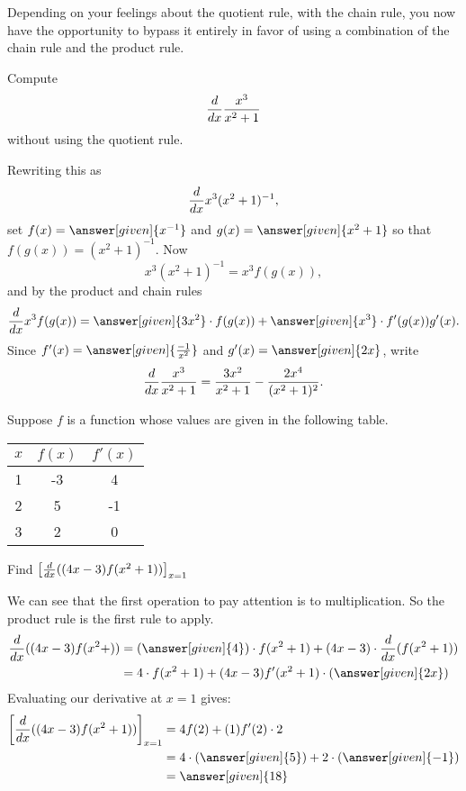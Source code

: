 \documentclass{ximera}
\begin{document}
Depending on your feelings about the quotient rule, with the chain rule, you now have the opportunity to bypass it entirely in favor of using a combination of the chain rule and the product rule.

\begin{example}
Compute
\[
\frac{d}{\mathop{}\!d x} \frac{x^3}{x^2+1}
\]
without using the quotient rule.
\begin{explanation}
Rewriting this as 
\[
\frac{d}{\mathop{}\!d x} x^3(x^2+1)^{-1}, 
\]
set $f(x) = \answer[given]{x^{-1}}$ and $g(x) = \answer[given]{x^2+1}$ so that $f(g(x)) = (x^2 + 1)^{-1}$. Now
\[
x^3(x^2+1)^{-1} = x^3 f(g(x)),
\]
and by the product and chain rules
\[
\ddx x^3 f(g(x)) = \answer[given]{3x^2} \cdot f(g(x))+ \answer[given]{x^3} \cdot f'(g(x))g'(x).
\]
Since $f'(x) = \answer[given]{\frac{-1}{x^2}}$ and $g'(x) = \answer[given]{2x}$, write
\[
\frac{d}{\mathop{}\!d x} \frac{x^3}{x^2+1} = \frac{3x^2}{x^2+1}-\frac{2x^4}{(x^2+1)^2}.
\]
\end{explanation}
\end{example}
\begin{example}
    Suppose $f$ is a function whose values are given in the following table.
    \begin{center}
        \begin{tabular}{c|cc}
        \hline
             $x$& $f(x)$ &$f'(x)$\\
             \hline
            1 & -3 &4\\
             2&  5&-1\\
             3&  2&0\\
        \end{tabular}
    \end{center}
    Find $\left[\frac{d}{\mathop{}\!d x} ((4x-3)f(x^2+1))\right]_{x=1}$
    \begin{explanation}
        We can see that the first operation to pay attention is to multiplication. So the product rule is the first rule to apply.
        \begin{align*}
        \ddx((4x-3)f(x^2+))&=(\answer[given]{4})\cdot f(x^2+1)+(4x-3)\cdot \ddx(f(x^2+1))\\
        &=4\cdot f(x^2+1)+(4x-3)f'(x^2+1)\cdot (\answer[given]{2x})
        \end{align*}
        Evaluating our derivative at $x=1$ gives:
        \begin{align*}
            \left[\ddx ((4x-3)f(x^2+1))\right]_{x=1}&=4f(2)+(1)f'(2)\cdot 2\\
            &=4\cdot(\answer[given]{5})+2\cdot(\answer[given]{-1})\\
            &=\answer[given]{18}
        \end{align*}
    \end{explanation}
\end{example}
\end{document}
